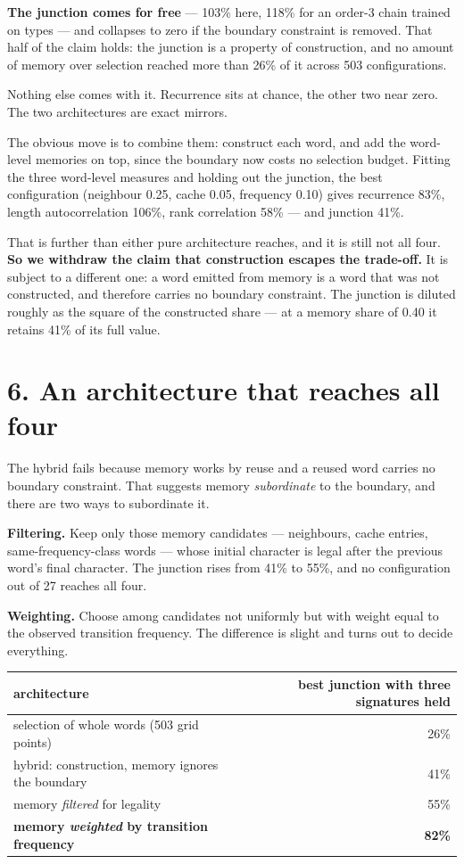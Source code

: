 \documentclass[11pt,a4paper]{article}
\begin{document}
\textbf{The junction comes for free} --- 103\% here, 118\% for an order-3 chain trained on types --- and collapses to zero if the boundary constraint is removed. That half of the claim holds: the junction is a property of construction, and no amount of memory over selection reached more than 26\% of it across 503 configurations.


Nothing else comes with it. Recurrence sits at chance, the other two near zero. The two architectures are exact mirrors.


The obvious move is to combine them: construct each word, and add the word-level memories on top, since the boundary now costs no selection budget. Fitting the three word-level measures and holding out the junction, the best configuration (neighbour 0.25, cache 0.05, frequency 0.10) gives recurrence 83\%, length autocorrelation 106\%, rank correlation 58\% --- and junction 41\%.


That is further than either pure architecture reaches, and it is still not all four. \textbf{So we withdraw the claim that construction escapes the trade-off.} It is subject to a different one: a word emitted from memory is a word that was not constructed, and therefore carries no boundary constraint. The junction is diluted roughly as the square of the constructed share --- at a memory share of 0.40 it retains 41\% of its full value.


\section*{6. An architecture that reaches all four}


The hybrid fails because memory works by reuse and a reused word carries no boundary constraint. That suggests memory \emph{subordinate} to the boundary, and there are two ways to subordinate it.


\textbf{Filtering.} Keep only those memory candidates --- neighbours, cache entries, same-frequency-class words --- whose initial character is legal after the previous word's final character. The junction rises from 41\% to 55\%, and no configuration out of 27 reaches all four.


\textbf{Weighting.} Choose among candidates not uniformly but with weight equal to the observed transition frequency. The difference is slight and turns out to decide everything.


\begin{table}[htbp]\centering\small
\begin{tabular}{@{}lr@{}}
\toprule
architecture & best junction with three signatures held \\
\midrule
selection of whole words (503 grid points) & 26\% \\
hybrid: construction, memory ignores the boundary & 41\% \\
memory \emph{filtered} for legality & 55\% \\
\textbf{memory \emph{weighted} by transition frequency} & \textbf{82\%} \\
\bottomrule
\end{tabular}
\end{table}
\end{document}
